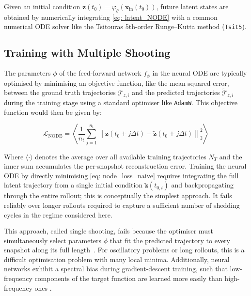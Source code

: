 
Given an initial condition $\mathbf{z}(t_0) = \varphi_\theta(\mathbf{x}_\text{in}(t_0))$, future latent states are obtained by numerically integrating \autoref{eq: latent_NODE} with a common numerical ODE solver like the Tsitouras 5th-order Runge--Kutta method (\texttt{Tsit5}). 


\subsection{Training with Multiple Shooting}
\label{subsect: NODEtraining}

The parameters $\phi$ of the feed-forward network $f_\phi$ in the neural ODE are typically optimised by minimising an objective function, like the mean squared error, between the ground truth trajectories $\mathcal{T}_{z,i}$ and the predicted trajectories $\tilde{\mathcal{T}}_{z,i}$ during the training stage using a standard optimiser like \texttt{AdamW}. This objective function would then be given by:

\begin{equation}\label{eq: node_loss_naive}
    \mathcal{L}_{\text{NODE}} = \left\langle \frac{1}{n_{t}} \sum_{j=1}^{n_{t}} \left\| \mathbf{z}(t_{0} + j\Delta t) - \tilde{\mathbf{z}}(t_{0} + j\Delta t) \right\|_2^2 \right\rangle
\end{equation}

Where $\langle \cdot \rangle$ denotes the average over all available training trajectories $N_T$ and the inner sum accumulates the per-snapshot reconstruction error. Training the neural ODE by directly minimising \autoref{eq: node_loss_naive} requires integrating the full latent trajectory from a single initial condition $\tilde{\mathbf{z}}(t_{0,i})$ and backpropagating through the entire rollout; this is conceptually the simplest approach. It fails reliably over longer rollouts required to capture a sufficient number of shedding cycles in the regime considered here.

This approach, called single shooting, fails because the optimiser must simultaneously select parameters $\phi$ that fit the predicted trajectory to every snapshot along its full length~\cite{Turan2022}. For oscillatory problems or long rollouts, this is a difficult optimisation problem with many local minima. Additionally, neural networks exhibit a spectral bias during gradient-descent training, such that low-frequency components of the target function are learned more easily than high-frequency ones \cite{Rahaman2019}. 

